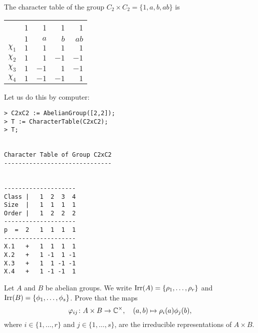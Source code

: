 \begin{example}
	The character table of the group $C_2\times C_2=\{1,a,b,ab\}$ is 
	\begin{center}
		\begin{tabular}{|c|rrrr|}
			\hline 
			& 1 & 1 & 1 & 1\tabularnewline
			& $1$ & $a$ & $b$ & $ab$\tabularnewline
			\hline 
			$\chi_{1}$ & $1$ & $1$ & $1$ & $1$\tabularnewline
			$\chi_{2}$ & $1$ & $1$ & $-1$ & $-1$\tabularnewline
			$\chi_{3}$ & $1$ & $-1$ & $1$ & $-1$\tabularnewline
			$\chi_{4}$ & $1$ & $-1$ & $-1$ & $1$\tabularnewline
			\hline
		\end{tabular}
	\end{center}
	Let us do this by computer:
\begin{lstlisting}
> C2xC2 := AbelianGroup([2,2]);
> T := CharacterTable(C2xC2);
> T;


Character Table of Group C2xC2
------------------------------


--------------------
Class |   1  2  3  4
Size  |   1  1  1  1
Order |   1  2  2  2
--------------------
p  =  2   1  1  1  1
--------------------
X.1   +   1  1  1  1
X.2   +   1 -1  1 -1
X.3   +   1  1 -1 -1
X.4   +   1 -1 -1  1    
\end{lstlisting}



%
%
%               
%               
\end{example}

\begin{exercise}
    Let $A$ and $B$ be abelian groups. 
    We write $\operatorname{Irr}(A)=\{\rho_1,\dots,\rho_r\}$ and 
    $\operatorname{Irr}(B)=\{\phi_1,\dots,\phi_s\}$. Prove
    that the maps 
    \[
    \varphi_{ij}\colon A\times B\to\mathbb{C}^\times,\quad
    (a,b)\mapsto\rho_i(a)\phi_j(b),
    \]
    where $i\in\{1,\dots,r\}$ and $j\in\{1,\dots,s\}$, are the irreducible representations of $A\times B$. 
\end{exercise}

